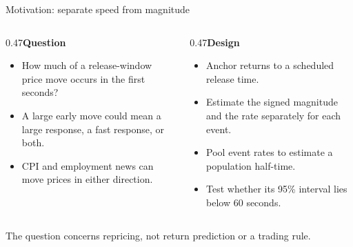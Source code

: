 \documentclass[aspectratio=169,11pt]{beamer}
\newcommand{\source}[1]{\par\vfill{\scriptsize\color{muted}#1}\par}
\newcommand{\heading}[1]{{\bfseries #1}\par\vspace{0.4em}}
\begin{document}
\begin{frame}{Motivation: separate speed from magnitude}
\begin{columns}[T,onlytextwidth]
\begin{column}{0.47\textwidth}\heading{Question}
\begin{itemize}
\item How much of a release-window price move occurs in the first seconds?
\item A large early move could mean a large response, a fast response, or both.
\item CPI and employment news can move prices in either direction.
\end{itemize}
\end{column}
\begin{column}{0.47\textwidth}\heading{Design}
\begin{itemize}
\item Anchor returns to a scheduled release time.
\item Estimate the signed magnitude and the rate separately for each event.
\item Pool event rates to estimate a population half-time.
\item Test whether its 95\% interval lies below 60 seconds.
\end{itemize}
\end{column}\end{columns}
\source{The question concerns repricing, not return prediction or a trading rule.}
\end{frame}
\end{document}
